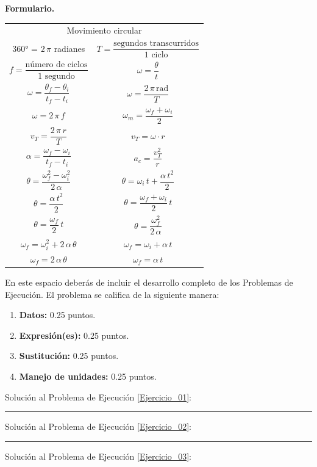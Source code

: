\documentclass[12pt, letter]{exam}
\begin{document}
\textbf{\huge{Formulario.}}
\begin{table}[H]
    \centering
    \setlength{\tabcolsep}{40pt}
    \renewcommand{\arraystretch}{2}
    \begin{tabular}{c  c}
        \multicolumn{2}{c}{Movimiento circular} \\
        \ang{360} = $2 \, \pi$ radianes & $T = \dfrac{\text{segundos transcurridos}}{\text{1 ciclo}}$ \\
        $f = \dfrac{\text{número de ciclos}}{\text{1 segundo}}$ & $\omega = \dfrac{\theta}{t}$ \\
        $\omega = \dfrac{\theta_{f} - \theta_{i}}{t_{f} - t_{i}}$ & $\omega = \dfrac{2 \, \pi \, \text{rad}}{T}$ \\
        $\omega = 2 \, \pi \, f $ & $\omega_{m} = \dfrac{\omega_{f} + \omega_{i}}{2}$ \\
        $v_{T} = \dfrac{2 \, \pi \, r}{T}$ & $v_{T} = \omega \cdot r$ \\
        $\alpha = \dfrac{\omega_{f} - \omega_{i}}{t_{f} - t_{i}}$ & $a_{c} = \dfrac{v_{T}^{2}}{r}$ \\
        $\theta = \dfrac{\omega_{f}^{2} - \omega_{i}^{2}}{2 \, \alpha}$ & $\theta = \omega_{i} \, t + \dfrac{\alpha \, t^{2}}{2}$ \\
        $\theta = \dfrac{\alpha \, t^{2}}{2}$ & $\theta = \dfrac{\omega_{f} + \omega_{i}}{2} \, t$ \\
        $\theta = \dfrac{\omega_{f}}{2} \, t$ & $\theta = \dfrac{\omega_{f}^{2}}{2 \, \alpha}$ \\
        $\omega_{f} = \omega_{i}^{2} + 2 \, \alpha \, \theta$ & $\omega_{f} = \omega_{i} + \alpha \, t$ \\
        $\omega_{f} = 2 \, \alpha \, \theta$ & $\omega_{f} = \alpha \, t$ \\ \hline
        
\end{tabular}
\end{table}

\newpage

En este espacio deberás de incluir el desarrollo completo de los Problemas de Ejecución. El problema se califica de la siguiente manera:
\begin{enumerate}[label=\alph*)]
\item \textbf{Datos:} 0.25 puntos.
\item \textbf{Expresión(es):} 0.25 puntos.
\item \textbf{Sustitución:} 0.25 puntos.
\item \textbf{Manejo de unidades:} 0.25 puntos.
\end{enumerate}

\vspace*{0.5cm}

Solución al Problema de Ejecución \ref{Ejercicio_01}:

\vspace*{4cm}
\rule{0.9\textwidth}{0.3mm}

Solución al Problema de Ejecución \ref{Ejercicio_02}:

\vspace*{4cm}
\rule{0.9\textwidth}{0.3mm}

Solución al Problema de Ejecución \ref{Ejercicio_03}:
\end{document}
